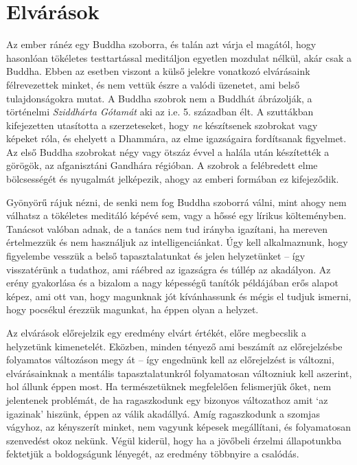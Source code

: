 \section{Elvárások}

Az ember ránéz egy Buddha szoborra, és talán azt várja el magától, hogy
hasonlóan tökéletes testtartással meditáljon egyetlen mozdulat nélkül,
akár csak a Buddha. Ebben az esetben viszont a külső jelekre vonatkozó
elvárásaink félrevezettek minket, és nem vettük észre a valódi üzenetet,
ami belső tulajdonságokra mutat. A Buddha szobrok nem a Buddhát
ábrázolják, a történelmi \emph{Sziddhárta Gótamát} aki az i.e. 5.
században élt. A szuttákban kifejezetten utasította a szerzeteseket,
hogy \emph{ne} készítsenek szobrokat vagy képeket róla, és ehelyett a
Dhammára, az elme igazságaira fordítsanak figyelmet. Az első Buddha
szobrokat négy vagy ötszáz évvel a halála után készítették a görögök, az
afganisztáni Gandhára régióban. A szobrok a felébredett elme
bölcsességét és nyugalmát jelképezik, ahogy az emberi formában ez
kifejeződik.

Gyönyörű rájuk nézni, de senki nem fog Buddha szoborrá válni, mint ahogy
nem válhatsz a tökéletes meditáló képévé sem, vagy a hőssé egy lírikus
költeményben. Tanácsot valóban adnak, de a tanács nem tud irányba
igazítani, ha mereven értelmezzük és nem használjuk az
intelligenciánkat. Úgy kell alkalmaznunk, hogy figyelembe vesszük a
belső tapasztalatunkat és jelen helyzetünket -- így visszatérünk a
tudathoz, ami ráébred az igazságra és túllép az akadályon. Az erény
gyakorlása és a bizalom a nagy képességű tanítók példájában erős alapot
képez, ami ott van, hogy magunknak jót kívánhassunk és mégis el tudjuk
ismerni, hogy pocsékul érezzük magunkat, ha éppen olyan a helyzet.

Az elvárások előrejelzik egy eredmény elvárt értékét, előre megbecslik a
helyzetünk kimenetelét. Eközben, minden tényező ami beszámít az
előrejelzésbe folyamatos változáson megy át -- így engednünk kell az
előrejelzést is változni, elvárásainknak a mentális tapasztalatunkról
folyamatosan változniuk kell aszerint, hol állunk éppen most. Ha
természetüknek megfelelően felismerjük őket, nem jelentenek problémát,
de ha ragaszkodunk egy bizonyos változathoz amit `az igazinak' hiszünk,
éppen az válik akadállyá. Amíg ragaszkodunk a szomjas vágyhoz, az
kényszerít minket, nem vagyunk képesek megállítani, és folyamatosan
szenvedést okoz nekünk. Végül kiderül, hogy ha a jövőbeli érzelmi
állapotunkba fektetjük a boldogságunk lényegét, az eredmény többnyire a
csalódás.

